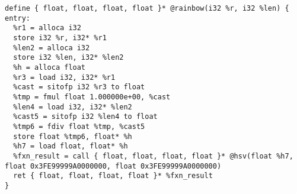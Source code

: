 \documentclass[main.tex]{subfiles}
\begin{document}
{\begin{lstlisting}
define { float, float, float, float }* @rainbow(i32 %r, i32 %len) {
entry:
  %r1 = alloca i32
  store i32 %r, i32* %r1
  %len2 = alloca i32
  store i32 %len, i32* %len2
  %h = alloca float
  %r3 = load i32, i32* %r1
  %cast = sitofp i32 %r3 to float
  %tmp = fmul float 1.000000e+00, %cast
  %len4 = load i32, i32* %len2
  %cast5 = sitofp i32 %len4 to float
  %tmp6 = fdiv float %tmp, %cast5
  store float %tmp6, float* %h
  %h7 = load float, float* %h
  %fxn_result = call { float, float, float, float }* @hsv(float %h7, float 0x3FE99999A0000000, float 0x3FE99999A0000000)
  ret { float, float, float, float }* %fxn_result
}
\end{lstlisting}
}




	
\end{document}
